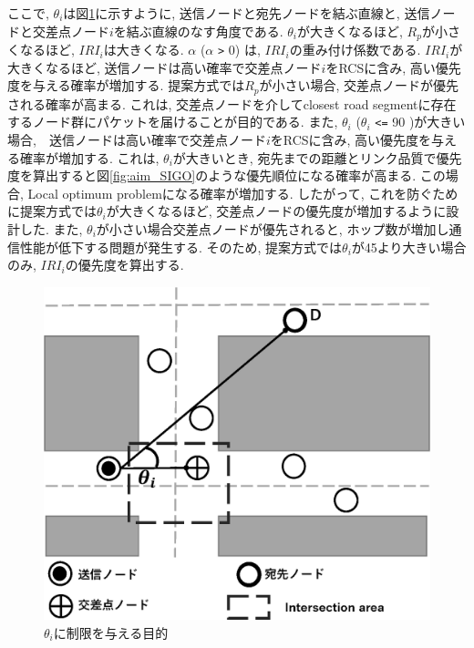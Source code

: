 \documentclass[10pt]{jreport}
\begin{document}
ここで, $\theta_i$は図\ref{fig:angle}に示すように, 送信ノードと宛先ノードを結ぶ直線と, 送信ノードと交差点ノード$i$を結ぶ直線のなす角度である. $\theta_i$が大きくなるほど, $R_p$が小さくなるほど, $IRI_i$は大きくなる. 
$\alpha$ ($\alpha$ \verb|>| 0) は, $IRI_i$の重み付け係数である. $IRI_i$が大きくなるほど, 送信ノードは高い確率で交差点ノード$i$をRCSに含み, 高い優先度を与える確率が増加する. 提案方式では$R_p$が小さい場合, 交差点ノードが優先される確率が高まる. これは, 交差点ノードを介してclosest road segmentに存在するノード群にパケットを届けることが目的である. また, $\theta_i$ ($\theta_i$ \verb|<=| 90 )が大きい場合,　送信ノードは高い確率で交差点ノード$i$をRCSに含み, 高い優先度を与える確率が増加する.
これは, $\theta_i$が大きいとき, 宛先までの距離とリンク品質で優先度を算出すると図\ref{fig:aim_SIGO}のような優先順位になる確率が高まる. この場合, Local optimum problemになる確率が増加する. したがって, これを防ぐために提案方式では$\theta_i$が大きくなるほど, 交差点ノードの優先度が増加するように設計した.
また, $\theta_i$が小さい場合交差点ノードが優先されると, ホップ数が増加し通信性能が低下する問題が発生する. 
そのため, 提案方式では$\theta_i$が45より大きい場合のみ, $IRI_i$の優先度を算出する.


\begin{figure}[!ht]
	\centering
	\includegraphics[width=120mm]{figures/angle.eps}
	\caption{$\theta_i$に制限を与える目的}
	\label{fig:angle}
\end{figure}
\end{document}
